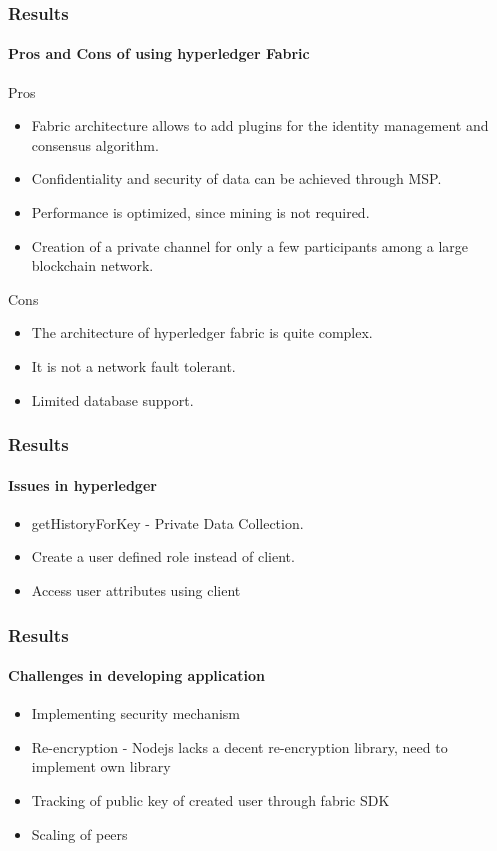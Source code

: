 \documentclass[english,hangout]{beamer}
\begin{document}
\begin{frame}[fragile]
 \frametitle{Results}
 \framesubtitle{Pros and Cons of using hyperledger Fabric}
 Pros
 \begin{itemize}
     \item Fabric architecture allows to add plugins for the identity management and consensus algorithm.
    \item Confidentiality and security of data can be achieved through MSP.
    \item Performance is optimized, since mining is not required.
    \item Creation of a private channel for only a few participants among
a large blockchain network.
 \end{itemize}
 Cons
 \begin{itemize}
     \item The architecture of hyperledger fabric is quite complex.
     \item It is not a network fault tolerant.
     \item Limited database support.
 \end{itemize}
\end{frame}



\begin{frame}[fragile]
 \frametitle{Results}
 \framesubtitle{Issues in hyperledger}
    \begin{itemize}
        \item getHistoryForKey - Private Data Collection. \cite{b7}
        \item Create a user defined role instead of client. \cite{b6}
        \item Access user attributes using client 
    \end{itemize}
\end{frame}



\begin{frame}[fragile]
 \frametitle{Results}
 \framesubtitle{Challenges in developing application}
    \begin{itemize}
        \item Implementing security mechanism
        \item Re-encryption - Nodejs lacks a decent re-encryption library, need to implement own library
        \item Tracking of public key of created user through fabric SDK
        \item Scaling of peers
    \end{itemize}
\end{frame}
\end{document}
